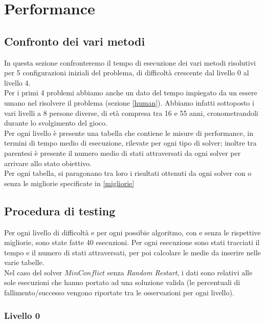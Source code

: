 
\chapter{Performance}
\label{cap:performance}
\section{Confronto dei vari metodi}
In questa sezione confronteremo il tempo di esecuzione dei vari metodi risolutivi per 5 configurazioni iniziali del problema, di difficoltà crescente dal livello 0 al livello 4.\\
Per i primi 4 problemi abbiamo anche un dato del tempo impiegato da un essere umano nel risolvere il problema (sezione \ref{human}). Abbiamo infatti sottoposto i vari livelli a 8 persone diverse, di età compresa tra 16 e 55 anni, cronometrandoli durante lo svolgimento del gioco.\\
Per ogni livello è presente una tabella che contiene le misure di performance, in termini di tempo medio di esecuzione, rilevate per ogni tipo di solver; inoltre tra parentesi è presente il numero medio di stati attraversati da ogni solver per arrivare allo stato obiettivo. \\
Per ogni tabella, si paragonano tra loro i risultati ottenuti da ogni solver con o senza le migliorie specificate in \ref{migliorie}

\section{Procedura di testing}
Per ogni livello di difficoltà e per ogni possibie algoritmo, con e senza le rispettive migliorie, sono state fatte 40 esecuzioni. Per ogni esecuzione sono stati tracciati il tempo e il numero di stati attraversati, per poi calcolare le medie da inserire nelle varie tabelle.\\
Nel caso del solver $MinConflict$ senza \textit{Random Restart}, i dati sono relativi alle sole esecuzioni che hanno portato ad una soluzione valida (le percentuali di fallimento/successo vengono riportate tra le osservazioni per ogni livello).

\subsection{Livello 0}

